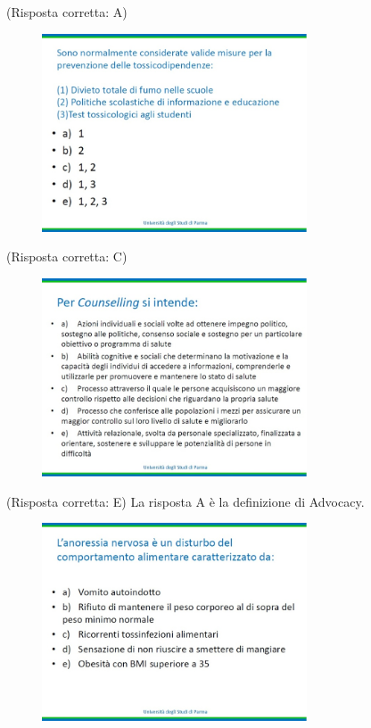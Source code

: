 (Risposta corretta: A)

\begin{figure}[!ht]
\centering
	\includegraphics[width=0.7\textwidth]{25/image6.jpeg}
	\end{figure}

(Risposta corretta: C)

\begin{figure}[!ht]
\centering
	\includegraphics[width=0.7\textwidth]{25/image7.jpeg}
	\end{figure}

(Risposta corretta: E) La risposta A è la definizione di Advocacy.

\begin{figure}[!ht]
\centering
	\includegraphics[width=0.7\textwidth]{25/image8.jpeg}
	\end{figure}

